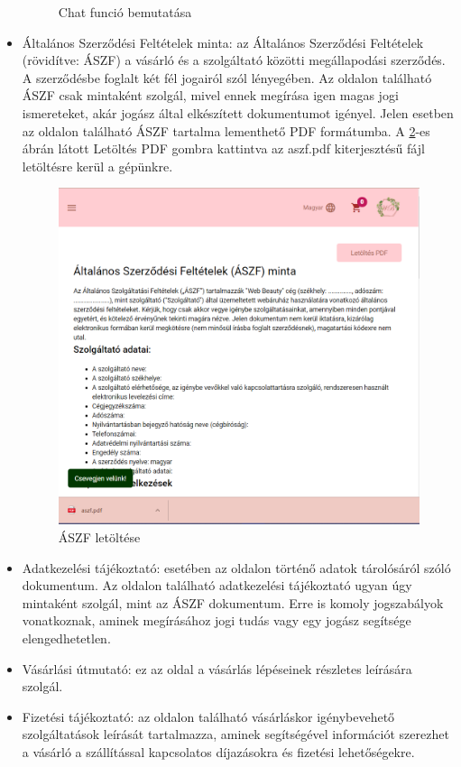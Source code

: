 \begin{itemize}
\begin{figure}[H]
		\caption{Chat funció bemutatása}
		\label{fig.exemple-13}
	\end{figure}
	\item Általános Szerződési Feltételek minta: az Általános Szerződési Feltételek (rövidítve: ÁSZF) a vásárló és a szolgáltató közötti megállapodási szerződés. A szerződésbe foglalt két fél jogairól szól lényegében. Az oldalon található ÁSZF csak mintaként szolgál, mivel ennek megírása igen magas jogi ismereteket, akár jogász által elkészített dokumentumot igényel. Jelen esetben az oldalon található ÁSZF tartalma lementhető PDF formátumba. A \ref{fig.exemple-14}-es ábrán látott Letöltés PDF gombra kattintva az aszf.pdf kiterjesztésű fájl letöltésre kerül a gépünkre.
	\begin{figure}[H]
		\centering
		\includegraphics[width=1.0\textwidth]{images/pd_letoltes.PNG}
		\caption{ÁSZF letöltése}
		\label{fig.exemple-14}
	\end{figure}
	\item Adatkezelési tájékoztató: esetében az oldalon történő adatok tárolósáról szóló dokumentum. Az oldalon található adatkezelési tájékoztató ugyan úgy mintaként szolgál, mint az ÁSZF dokumentum. Erre is komoly jogszabályok vonatkoznak, aminek megírásához jogi tudás vagy egy jogász segítsége elengedhetetlen.
	\item Vásárlási útmutató: ez az oldal a vásárlás lépéseinek részletes leírására szolgál.
	\item Fizetési tájékoztató: az oldalon található vásárláskor igénybevehető szolgáltatások leírását tartalmazza, aminek segítségével információt szerezhet a vásárló a szállítással kapcsolatos díjazásokra és fizetési lehetőségekre.
\end{itemize}
